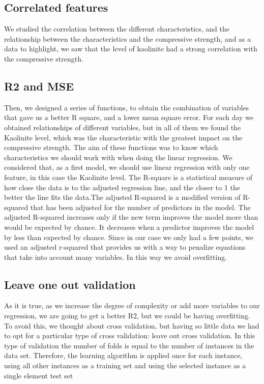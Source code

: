 \documentclass[10pt,conference,compsocconf]{IEEEtran}
\begin{document}
\subsection{Correlated features}
We studied the correlation between the different characteristics, and the relationship between the characteristics and the compressive strength, and as a data to highlight, we saw that the level of kaolinite had a strong correlation with the compressive strength.
\subsection{R2 and MSE}
Then, we designed a series of functions, to obtain the combination of variables that gave us a better R square, and a lower mean square error. For each day we obtained relationships of different variables, but in all of them we found the Kaolinite level, which was the characteristic with the greatest impact on the compressive strength. 
The aim of these functions was to know which characteristics we should work with when doing the linear regression. We considered that, as a first model, we should use linear regression with only one feature, in this case the Kaolinite level.
The R-square is a statistical measure of how close the data is to the adjusted regression line, and the closer to 1 the better the line fits the data.The adjusted R-squared is a modified version of R-squared that has been adjusted for the number of predictors in the model. The adjusted R-squared increases only if the new term improves the model more than would be expected by chance. It decreases when a predictor improves the model by less than expected by chance. Since in our case we only had a few points, we used an adjusted r-squared that provides us with a way to penalize equations that take into account many variables. In this way we avoid overfitting.
\subsection{Leave one out validation}
As it is true, as we increase the degree of complexity or add more variables to our regression, we are going to get a better R2, but we could be having overfitting. To avoid this, we thought about cross validation, but having so little data we had to opt for a particular type of cross validation: leave out cross validation. In this type of validation the number of folds is equal to the number of instances in the data set. Therefore, the learning algorithm is applied once for each instance, using all other instances as a training set and using the selected instance as a single element test set
\end{document}
